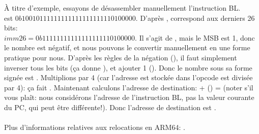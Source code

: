 À titre d'exemple, essayons de désassembler manuellement l'instruction BL.\\
 est $0b10010111111111111111111110100000$.
D'après ,  correspond aux derniers
26 bits:\\
$imm26 = 0b11111111111111111110100000$.
Il s'agit de , mais le \ac{MSB} est 1,
donc le nombre est négatif, et nous pouvons le convertir manuellement en une forme
pratique pour nous.
D'après les règles de la négation (), il faut simplement
inverser tous les bits (ça donne ), et ajouter 1 ().
Donc le nombre sous sa forme signée est .
Multiplions  par 4 (car l'adresse est stockée dans l'opcode est divisée
par 4): ça fait .
Maintenant calculons l'adresse de destination:  + () = 
(noter s'il vous plaît: nous considérons l'adresse de l'instruction BL, pas la valeur
courante du \ac{PC}, qui peut être différente!).
Donc l'adresse de destination est .\\
\\
Plus d'informations relatives aux relocations en ARM64: \ARMELF.
